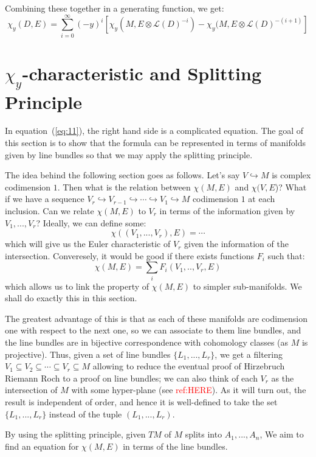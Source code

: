 \documentclass{book}
\newcommand{\CL}{{\mathcal{L}}}
\newcommand{\sse}{\subseteq}
\begin{document}
Combining these together in a generating function, we get:
\begin{equation}\label{eq:11}
  \chi_y(D, E) = \sum_{i=0}^\infty (-y)^i [\chi_y(M, E\otimes \CL(D)^{-i}) - \chi_y (M, E\otimes
  \CL(D)^{-(i+1)}]
\end{equation}

\section{$\chi_y$-characteristic and Splitting Principle}\label{sec:virtualEulerChar}

In equation~(\ref{eq:11}), the right hand side is a complicated equation. The goal of this section is to show
that the formula can be represented in terms of manifolds given by line bundles so that we may apply the splitting
principle.

The idea behind the following section goes as follows. Let's say $V \hookrightarrow M$ is complex codimension
$1$. Then what is the relation between $\chi(M, E)$ and $\chi(V, E$)? What if we have a sequence $V_r
\hookrightarrow V_{r-1} \hookrightarrow \cdots \hookrightarrow V_1 \hookrightarrow M$ codimension $1$ at
each inclusion. Can we relate $\chi(M, E)$ to $V_r$ in terms of the information given by $V_1, ..., V_r$? Ideally, we can define some:
\[
  \chi((V_1, ..., V_r), E) = \cdots
\]
which will give us the Euler characteristic of $V_r$ given the information of the intersection. Converesely,
it would be good if there exists functions $F_i$ such that:
\[
  \chi(M, E) = \sum_i F_i(V_1,.., V_r, E)
\]
which allows us to link the property of $\chi(M,E)$ to simpler sub-manifolds. We shall do exactly this in this
section.

The greatest advantage of this is that as each of these manifolds are codimension one with respect to the next
one, so we can associate to them line bundles, and the line bundles are in bijective correspondence with
cohomology classes (as $M$ is projective). Thus, given a set of line bundles $\{L_1, ..., L_r\}$, we get a
filtering $V_1 \sse V_2 \sse \cdots \sse V_r \sse M$ allowing to reduce the eventual proof of Hirzebruch
Riemann Roch to a proof on line bundles; we can also think of each $V_r$ as the intersection of $M$ with some
hyper-plane (see \textcolor{red}{ref:HERE}). As it will turn out, the result is independent of order,
and hence it is well-defined to take the set $\{L_1, ..., L_r\}$ instead of the tuple $(L_1, ..., L_r)$.

By using the splitting principle, given $TM$ of $M$ splits into $A_1, ..., A_n$, We aim to find an equation
for $\chi(M, E)$ in terms of the line bundles.
\end{document}
